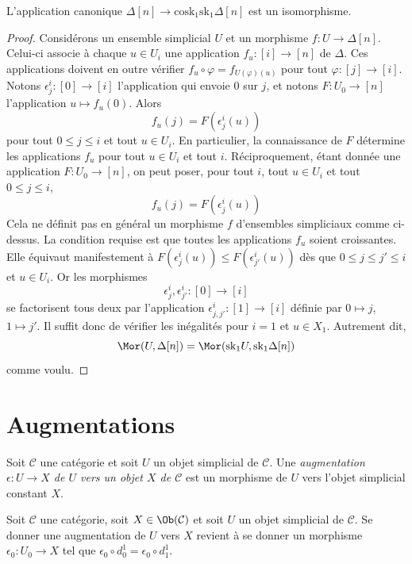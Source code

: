 \begin{lemma}
\label{lemma-simplex-cosk}
L'application canonique
$\Delta[n] \to \text{cosk}_1 \text{sk}_1 \Delta[n]$
est un isomorphisme.
\end{lemma}

\begin{proof}
Considérons un ensemble simplicial $U$ et un morphisme
$f : U \to \Delta[n]$. Celui-ci associe à chaque $u \in U_i$ une
application $f_u : [i] \to [n]$ de $\Delta$. Ces applications doivent en
outre vérifier $f_u \circ \varphi = f_{U(\varphi)(u)}$ pour tout
$\varphi : [j] \to [i]$. Notons $\epsilon^i_j : [0] \to [i]$
l'application qui envoie $0$ sur $j$, et notons $F : U_0 \to [n]$
l'application $u \mapsto f_u(0)$. Alors
$$
f_u(j) = F(\epsilon^i_j(u))
$$
pour tout $0 \leq j \leq i$ et tout $u \in U_i$. En particulier, la
connaissance de $F$ détermine les applications $f_u$ pour tout
$u\in U_i$ et tout $i$. Réciproquement, étant donnée une application
$F : U_0 \to [n]$, on peut poser, pour tout $i$, tout $u \in U_i$ et
tout $0 \leq j \leq i$,
$$
f_u(j) = F(\epsilon^i_j(u))
$$
Cela ne définit pas en général un morphisme $f$ d'ensembles simpliciaux
comme ci-dessus. La condition requise est que toutes les applications
$f_u$ soient croissantes. Elle équivaut manifestement à
$F(\epsilon^i_j(u)) \leq F(\epsilon^i_{j'}(u))$ dès que
$0 \leq j \leq j' \leq i$ et $u \in U_i$. Or les morphismes
$$
\epsilon^i_j, \epsilon^i_{j'} : [0] \to [i]
$$
se factorisent tous deux par l'application
$\epsilon^i_{j, j'} : [1] \to [i]$ définie par
$0 \mapsto j$, $1 \mapsto j'$. Il suffit donc de vérifier les inégalités
pour $i = 1$ et $u \in X_1$. Autrement dit,
$$
\Mor(U, \Delta[n])
=
\Mor(\text{sk}_1 U, \text{sk}_1 \Delta[n])
$$
comme voulu.
\end{proof}



\section{Augmentations}
\label{section-augmentation}

\begin{definition}
\label{definition-augmentation}
Soit $\mathcal{C}$ une catégorie et soit $U$ un objet simplicial de
$\mathcal{C}$. Une {\it augmentation $\epsilon : U \to X$ de $U$ vers
un objet $X$ de $\mathcal{C}$} est un morphisme de $U$ vers l'objet
simplicial constant $X$.
\end{definition}

\begin{lemma}
\label{lemma-augmentation-howto}
Soit $\mathcal{C}$ une catégorie, soit $X \in \Ob(\mathcal{C})$ et soit
$U$ un objet simplicial de $\mathcal{C}$. Se donner une augmentation de
$U$ vers $X$ revient à se donner un morphisme $\epsilon_0 : U_0 \to X$
tel que $\epsilon_0 \circ d^1_0 = \epsilon_0 \circ d^1_1$.
\end{lemma}

